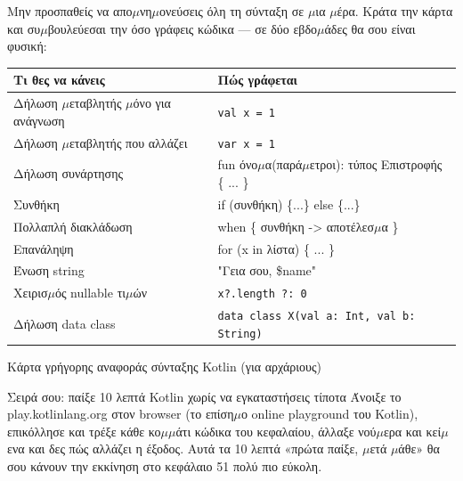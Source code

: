 
Μην προσπαθείς να απο$\mu$νη$\mu$ονεύσεις όλη τη σύνταξη σε $\mu$ια $\mu$έρα. Κράτα την κάρτα και συ$\mu$βουλεύεσαι την όσο γράφεις κώδικα — σε δύο εβδο$\mu$άδες θα σου είναι φυσική:

\begin{center}
\begin{tabularx}{\linewidth}{|X|X|}
\hline
\textbf{Τι θες να κάνεις} & \textbf{Πώς γράφεται} \tabularnewline
\hline
Δήλωση $\mu$εταβλητής $\mu$όνο για ανάγνωση & \texttt{val x = 1} \tabularnewline
Δήλωση $\mu$εταβλητής που αλλάζει & \texttt{var x = 1} \tabularnewline
Δήλωση συνάρτησης & fun όνο$\mu$α(παρά$\mu$ετροι): τύπος Επιστροφής \{ ... \} \tabularnewline
Συνθήκη & if (συνθήκη) \{...\} else \{...\} \tabularnewline
Πολλαπλή διακλάδωση & when \{ συνθήκη -> αποτέλεσ$\mu$α \} \tabularnewline
Επανάληψη & for (x in λίστα) \{ ... \} \tabularnewline
Ένωση string & "Γεια σου, \$name" \tabularnewline
Χειρισ$\mu$ός nullable τι$\mu$ών & \texttt{x?.\allowbreak length ?: 0} \tabularnewline
Δήλωση data class & \texttt{data class X(val a: Int, val b: String)} \tabularnewline
\hline
\end{tabularx}
\end{center}

\begin{center}\small\color{gray}Κάρτα γρήγορης αναφοράς σύνταξης Kotlin (για αρχάριους)\end{center}

\begin{tcbpractice}{Σειρά σου: παίξε 10 λεπτά Kotlin χωρίς να εγκαταστήσεις τίποτα}
Άνοιξε το play.kotlinlang.org στον browser (το επίση$\mu$ο online playground του Kotlin), επικόλλησε και τρέξε κάθε κο$\mu$$\mu$άτι κώδικα του κεφαλαίου, άλλαξε νού$\mu$ερα και κεί$\mu$ενα και δες πώς αλλάζει η έξοδος. Αυτά τα 10 λεπτά «πρώτα παίξε, $\mu$ετά $\mu$άθε» θα σου κάνουν την εκκίνηση στο κεφάλαιο 51 πολύ πιο εύκολη.

\end{tcbpractice}

